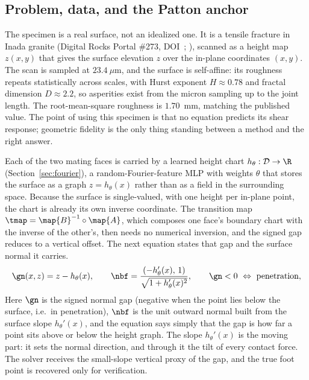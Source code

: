 \subsection{Problem, data, and the Patton anchor}\label{sec:cv7-data}

The specimen is a real surface, not an idealized one. It is a tensile fracture in Inada granite (Digital Rocks Portal \#273, DOI~; \citealp{inada2020digitalrocks}), scanned as a height map $z(x,y)$ that gives the surface elevation $z$ over the in-plane coordinates $(x,y)$. The scan is sampled at $23.4~\mu$m, and the surface is self-affine: its roughness repeats statistically across scales, with Hurst exponent $H\approx0.78$ and fractal dimension $D\approx2.2$, so asperities exist from the micron sampling up to the joint length. The root-mean-square roughness is $1.70$~mm, matching the published value. The point of using this specimen is that no equation predicts its shear response; geometric fidelity is the only thing standing between a method and the right answer.

Each of the two mating faces is carried by a learned height chart $h_\theta:\mathcal D\to\R$ (Section~\ref{sec:fourier}), a random-Fourier-feature MLP with weights $\theta$ that stores the surface as a graph $z=h_\theta(x)$ rather than as a field in the surrounding space. Because the surface is single-valued, with one height per in-plane point, the chart is already its own inverse coordinate. The transition map $\tmap=\map{B}^{-1}\circ\map{A}$, which composes one face's boundary chart with the inverse of the other's, then needs no numerical inversion, and the signed gap reduces to a vertical offset. The next equation states that gap and the surface normal it carries.
%
\begin{equation}\label{eq:cv7-gap}
\gn(x,z)=z-h_\theta(x),\qquad
\nbf=\frac{(-h_\theta'(x),\,1)}{\sqrt{1+h_\theta'(x)^2}},\qquad \gn<0\ \Leftrightarrow\ \text{penetration},
\end{equation}
%
Here $\gn$ is the signed normal gap (negative when the point lies below the surface, i.e.\ in penetration), $\nbf$ is the unit outward normal built from the surface slope $h_\theta'(x)$, and the equation says simply that the gap is how far a point sits above or below the height graph. The slope $h_\theta'(x)$ is the moving part: it sets the normal direction, and through it the tilt of every contact force. The solver receives the small-slope vertical proxy of the gap, and the true foot point is recovered only for verification.

